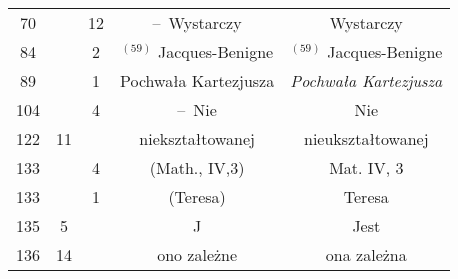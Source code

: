 \documentclass[a4paper,11pt]{article}
\begin{document}
\begin{center}
\begin{tabular}{|c|c|c|c|c|}
    70  & & 12 & --~Wystarczy & Wystarczy \\
    84  & &  2 & $^{ ( 59 ) }$\hspace{0.3em} Jacques-Benigne
           & $^{ ( 59 ) }$ Jacques-Benigne \\
    89  & &  1 & Pochwała Kartezjusza & \textit{Pochwała Kartezjusza} \\
    104 & &  4 & --~Nie & Nie \\
    122 & 11 & & niekształtowanej & nieukształtowanej \\
    133 & &  4 & (Math., IV,3) & Mat. IV, 3 \\
    133 & &  1 & (Teresa) & Teresa \\
    135 &  5 & & J & Jest \\
    136 & 14 & & ono zależne & ona zależna \\
    \hline
  \end{tabular}





  \newpage


\end{center}
\end{document}
